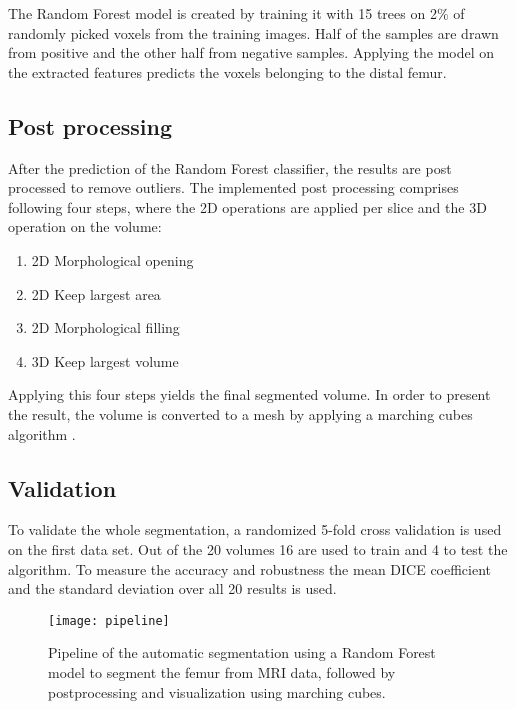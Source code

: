 The Random Forest model is created by training it with 15 trees on 2\% of randomly picked voxels from the training images. Half of the samples are drawn from positive and the other half from negative samples. Applying the model on the extracted features predicts the voxels belonging to the distal femur.
\subsection{Post processing}
After the prediction of the Random Forest classifier, the results are post processed to remove outliers. The implemented post processing comprises following four steps, where the 2D operations are applied per slice and the 3D operation on the volume:
\begin{enumerate}
\item 2D Morphological opening
\item 2D Keep largest area
\item 2D Morphological filling
\item 3D Keep largest volume
\end{enumerate}

Applying this four steps yields the final segmented volume. In order to present the result, the volume is converted to a mesh by applying a marching cubes algorithm \cite{lorensen}. 
\subsection{Validation}
To validate the whole segmentation, a randomized 5-fold cross validation \cite{cross} is used on the first data set. Out of the 20 volumes 16 are used to train and 4 to test the algorithm. To measure the accuracy and robustness the mean DICE coefficient \cite{powers2011evaluation} and the standard deviation over all 20 results is used.
\begin{figure*}[!t]
\centering
\texttt{[image: pipeline]}
\caption{Pipeline of the automatic segmentation using a Random Forest model to segment the femur from MRI data, followed by postprocessing and visualization using marching cubes.}
\label{fig:pipeline}
\end{figure*}

